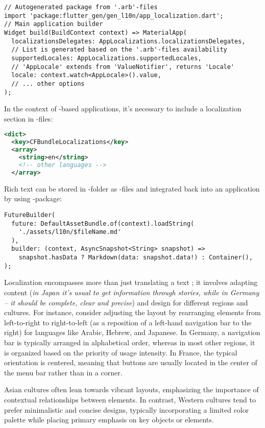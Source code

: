 \begin{lstlisting}
// Autogenerated package from '.arb'-files
import 'package:flutter_gen/gen_l10n/app_localization.dart';
// Main application builder
Widget build(BuildContext context) => MaterialApp(
  localizationsDelegates: AppLocalizations.localizationsDelegates,
  // List is generated based on the '.arb'-files availability
  supportedLocales: AppLocalizations.supportedLocales,
  // 'AppLocale' extends from 'ValueNotifier', returns 'Locale'
  locale: context.watch<AppLocale>().value,
  // ... other options
);
\end{lstlisting}

\noindent In the context of -based applications, it's necessary to include a localization section in 
-files:

\begin{lstlisting}[language=xml]
<dict>
  <key>CFBundleLocalizations</key>
  <array>
    <string>en</string>
    <!-- other languages -->
  </array>
\end{lstlisting}

\noindent Rich text can be stored in -folder as -files and integrated back into an application by using 
-package:

\begin{lstlisting}
FutureBuilder(
  future: DefaultAssetBundle.of(context).loadString(
    './assets/l10n/$fileName.md'
  ),
  builder: (context, AsyncSnapshot<String> snapshot) =>
    snapshot.hasData ? Markdown(data: snapshot.data!) : Container(),
);
\end{lstlisting}

\noindent Localization encompasses more than just translating a text \cite{Hofs03}; it involves adapting content 
(\emph{in Japan it's usual to get information through stories, while in Germany -- it should be complete, clear and 
precise}) and design for different regions and cultures. For instance, consider adjusting the layout by rearranging 
elements from left-to-right to right-to-left (as a reposition of a left-hand navigation bar to the right) for languages 
like Arabic, Hebrew, and Japanese. In Germany, a navigation bar is typically arranged in alphabetical order, whereas 
in most other regions, it is organized based on the priority of usage intensity. In France, the typical orientation is 
centered, meaning that buttons are usually located in the center of the menu bar rather than in a corner.

Asian cultures often lean towards vibrant layouts, emphasizing the importance of contextual relationships between 
elements. In contrast, Western cultures tend to prefer minimalistic and concise designs, typically incorporating a 
limited color palette while placing primary emphasis on key objects or elements.

